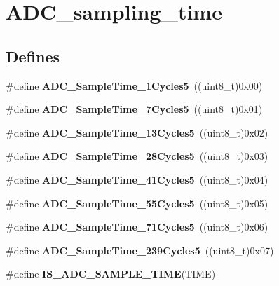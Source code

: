 \hypertarget{group__ADC__sampling__time}{
\section{ADC\_\-sampling\_\-time}
\label{group__ADC__sampling__time}
}
\subsection*{Defines}
\begin{DoxyCompactItemize}
\item 
\hypertarget{group__ADC__sampling__time_gad085065e48857ada890863a7db575c6e}{
\#define {\bfseries ADC\_\-SampleTime\_\-1Cycles5}~((uint8\_\-t)0x00)}
\label{group__ADC__sampling__time_gad085065e48857ada890863a7db575c6e}

\item 
\hypertarget{group__ADC__sampling__time_gac4101073619c4d79efa28a477696b3f5}{
\#define {\bfseries ADC\_\-SampleTime\_\-7Cycles5}~((uint8\_\-t)0x01)}
\label{group__ADC__sampling__time_gac4101073619c4d79efa28a477696b3f5}

\item 
\hypertarget{group__ADC__sampling__time_gaef37e223e826ac5e6ee5ef30881f9b27}{
\#define {\bfseries ADC\_\-SampleTime\_\-13Cycles5}~((uint8\_\-t)0x02)}
\label{group__ADC__sampling__time_gaef37e223e826ac5e6ee5ef30881f9b27}

\item 
\hypertarget{group__ADC__sampling__time_ga6251e64783f7a6562e17e71f7edd68d8}{
\#define {\bfseries ADC\_\-SampleTime\_\-28Cycles5}~((uint8\_\-t)0x03)}
\label{group__ADC__sampling__time_ga6251e64783f7a6562e17e71f7edd68d8}

\item 
\hypertarget{group__ADC__sampling__time_gadc3d26f9bf5fa6589889cc938c66e0e7}{
\#define {\bfseries ADC\_\-SampleTime\_\-41Cycles5}~((uint8\_\-t)0x04)}
\label{group__ADC__sampling__time_gadc3d26f9bf5fa6589889cc938c66e0e7}

\item 
\hypertarget{group__ADC__sampling__time_ga6a6fbbadc0e35a719fb749bf6b0704d6}{
\#define {\bfseries ADC\_\-SampleTime\_\-55Cycles5}~((uint8\_\-t)0x05)}
\label{group__ADC__sampling__time_ga6a6fbbadc0e35a719fb749bf6b0704d6}

\item 
\hypertarget{group__ADC__sampling__time_gae46e8978ac3160969156739ddb867dae}{
\#define {\bfseries ADC\_\-SampleTime\_\-71Cycles5}~((uint8\_\-t)0x06)}
\label{group__ADC__sampling__time_gae46e8978ac3160969156739ddb867dae}

\item 
\hypertarget{group__ADC__sampling__time_ga93117dc4090dc4e3e84e0eef6d6ab073}{
\#define {\bfseries ADC\_\-SampleTime\_\-239Cycles5}~((uint8\_\-t)0x07)}
\label{group__ADC__sampling__time_ga93117dc4090dc4e3e84e0eef6d6ab073}

\item 
\#define {\bfseries IS\_\-ADC\_\-SAMPLE\_\-TIME}(TIME)
\end{DoxyCompactItemize}


